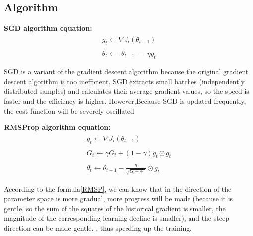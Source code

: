 \documentclass{article}
\begin{document}
\subsection{Algorithm}

\textbf{SGD algorithm equation:}
\begin{equation}\label{sgd}
\begin{aligned}
\begin{array}{l}g_t\leftarrow\nabla J_i\left(\theta_{t-1}\right)\end{array}\\
\begin{array}{l}\theta_t\leftarrow\end{array}\theta_{t-1}\;-\;\eta g_t
\end{aligned}
\end{equation}

SGD is a variant of the gradient descent algorithm because the original gradient descent algorithm is too inefficient. SGD extracts small batches (independently distributed samples) and calculates their average gradient values, so the speed is faster and the efficiency is higher. However,Because SGD is updated frequently, the cost function will be severely oscillated 

\textbf{RMSProp algorithm equation:}
\begin{equation}\label{RMSP}
\begin{aligned}
\begin{array}{l}g_t\leftarrow\nabla J_i\left(\theta_{t-1}\right)\end{array}\\
\begin{array}{l}G_t\leftarrow\gamma G_t+\left(1-\gamma\right)g_t\odot g_t\end{array}\\
\begin{array}{l}\theta_t\leftarrow\theta_{t-1}-\frac\eta{\sqrt{G_t+\in}}\odot g_t\end{array}
\end{aligned}
\end{equation}

According to the formula\ref{RMSP}, we can know that in the direction of the parameter space is more gradual, more progress will be made (because it is gentle, so the sum of the squares of the historical gradient is smaller, the magnitude of the corresponding learning decline is smaller), and the steep direction can be made gentle. , thus speeding up the training.
\end{document}
